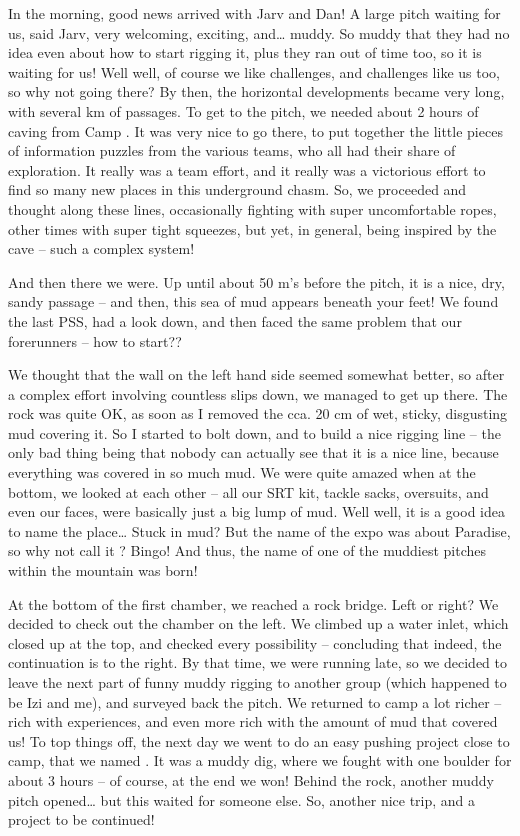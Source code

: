 In the morning, good news arrived with Jarv and Dan! A large pitch
waiting for us, said Jarv, very welcoming, exciting, and\ldots{} muddy.
So muddy that they had no idea even about how to start rigging it, plus
they ran out of time too, so it is waiting for us! Well well, of course
we like challenges, and challenges like us too, so why not going there?
By then, the horizontal developments became very long, with several km
of passages. To get to the pitch, we needed about 2 hours of caving from
Camp . It was very nice to go there, to put together the
little pieces of information puzzles from the various teams, who all had
their share of exploration. It really was a team effort, and it really
was a victorious effort to find so many new places in this underground
chasm. So, we proceeded and thought along these lines, occasionally
fighting with super uncomfortable ropes, other times with super tight
squeezes, but yet, in general, being inspired by the cave -- such a
complex system!

And then there we were. Up until about 50 m's before the pitch, it is a
nice, dry, sandy passage -- and then, this sea of mud appears beneath
your feet! We found the last PSS, had a look down, and then faced the
same problem that our forerunners -- how to start??

We thought that the wall on the left hand side seemed somewhat better,
so after a complex effort involving countless slips down, we managed to
get up there. The rock was quite OK, as soon as I removed the cca. 20 cm
of wet, sticky, disgusting mud covering it. So I started to bolt down,
and to build a nice rigging line -- the only bad thing being that nobody
can actually see that it is a nice line, because everything was covered
in so much mud. We were quite amazed when at the bottom, we looked at
each other -- all our SRT kit, tackle sacks, oversuits, and even our
faces, were basically just a big lump of mud. Well well, it is a good
idea to name the place\ldots{} Stuck in mud? But the name of the expo
was about Paradise, so why not call it ? Bingo!
And thus, the name of one of the muddiest pitches within the mountain
was born!

At the bottom of the first chamber, we reached a rock bridge. Left or
right? We decided to check out the chamber on the left. We climbed up a
water inlet, which closed up at the top, and checked every possibility
-- concluding that indeed, the continuation is to the right. By that
time, we were running late, so we decided to leave the next part of
funny muddy rigging to another group (which happened to be Izi and me),
and surveyed back the pitch. We returned to camp a lot richer -- rich
with experiences, and even more rich with the amount of mud that covered
us! To top things off, the next day we went to do an easy pushing
project close to camp, that we named . It was a muddy
dig, where we fought with one boulder for about 3 hours -- of course, at
the end we won! Behind the rock, another muddy pitch opened\ldots{} but
this waited for someone else. So, another nice trip, and a project to be
continued!

